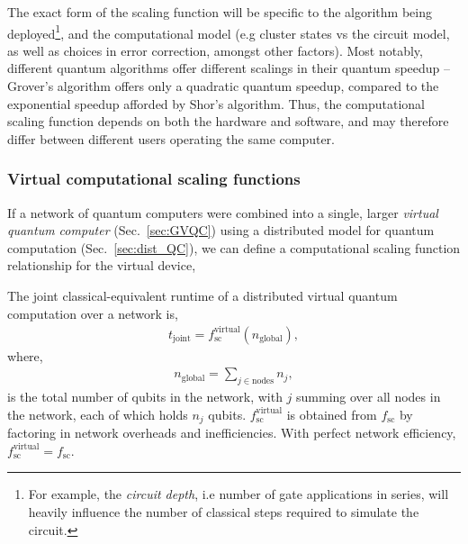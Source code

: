 The exact form of the scaling function will be specific to the algorithm being deployed\footnote{For example, the \textit{circuit depth}, i.e number of gate applications in series, will heavily influence the number of classical steps required to simulate the circuit.}, and the computational model (e.g cluster states vs the circuit model, as well as choices in error correction, amongst other factors). Most notably, different quantum algorithms offer different scalings in their quantum speedup -- Grover's algorithm offers only a quadratic quantum speedup, compared to the exponential speedup afforded by Shor's algorithm. Thus, the computational scaling function depends on both the hardware and software, and may therefore differ between different users operating the same computer.

%
%

\subsubsection{Virtual computational scaling functions}

If a network of quantum computers were combined into a single, larger \textit{virtual quantum computer} (Sec.~\ref{sec:GVQC}) using a distributed model for quantum computation (Sec.~\ref{sec:dist_QC}), we can define a computational scaling function relationship for the virtual device,

\begin{definition}
The joint classical-equivalent runtime of a distributed virtual quantum computation over a network is,
\begin{align}
t_\text{joint} = f_\text{sc}^\text{virtual}(n_\text{global}),
\end{align}
where,
\begin{align}
n_\text{global} = \sum_{j\in\text{nodes}} n_j,
\end{align}
is the total number of qubits in the network, with $j$ summing over all nodes in the network, each of which holds $n_j$ qubits. $f_\text{sc}^\text{virtual}$ is obtained from $f_\text{sc}$ by factoring in network overheads and inefficiencies. With perfect network efficiency, \mbox{$f_\text{sc}^\text{virtual}=f_\text{sc}$}.
\end{definition}

%
%


